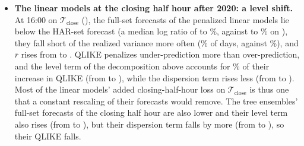 \begin{itemize}
  linear models on every bar of \rhcaYearsOos) and more informative than the HAR benchmark set of the same class
  ($R^2$ of \rhcaLinFullMzlRsqBarOosRng{} for the linear models and \rhcaTreeFullMzlRsqBarOosRng{} for the trees,
  against \rhcaAllHarMzlRsqBarOosRng).
\item \textbf{The linear models at the closing half hour after 2020: a level shift.} At 16:00 on
  $\mathcal T_{\mathrm{close}}$ (\rhcaYearsOos), the full-set forecasts of the penalized linear models lie below the
  HAR-set forecast (a median log ratio of \rhcaLinMedLogRatioCloseOosMin{} to \rhcaLinMedLogRatioCloseOosMax\%, against
  \rhcaLinMedLogRatioClosePreMin{} to \rhcaLinMedLogRatioClosePreMax\% on \rhcaYearsPre), they fall short of the
  realized variance more often (\rhcaLinFullUnderCloseOosRng\% of days, against \rhcaLinHarUnderCloseOos\%), and
  $\bar r$ rises from \rhcaLinHarMrCloseOos{} to \rhcaLinFullMrCloseOosRng. QLIKE penalizes under-prediction more than
  over-prediction, and the level term of the decomposition above accounts for \rhcaLinQlShareCloseOosRng\% of their
  increase in QLIKE (from \rhcaLinHarQlCloseOos{} to \rhcaLinFullQlCloseOosRng), while the dispersion term rises less
  (from \rhcaLinHarQdCloseOos{} to \rhcaLinFullQdCloseOosRng). Most of the linear models' added closing-half-hour loss
  on $\mathcal T_{\mathrm{close}}$ is thus one that a constant rescaling of their forecasts would remove. The tree
  ensembles' full-set forecasts of the closing half hour are also lower and their level term also rises (from
  \rhcaTreeHarQlCloseOosRng{} to \rhcaTreeFullQlCloseOosRng), but their dispersion term falls by more (from
  \rhcaTreeHarQdCloseOosRng{} to \rhcaTreeFullQdCloseOosRng), so their QLIKE falls.
\end{itemize}



